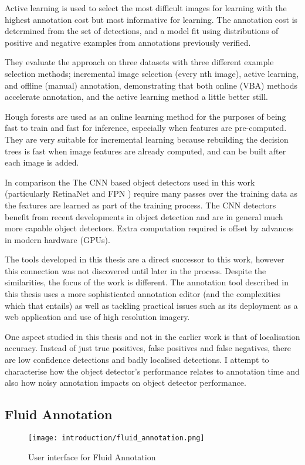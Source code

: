Active learning is used to select the most difficult images for learning with the highest annotation cost but most informative for learning. The annotation cost is determined from the set of detections, and a model fit using distributions of positive and negative examples from annotations previously verified. 

They evaluate the approach on  three datasets with three different example selection methods; incremental image selection (every nth image), active learning, and offline (manual) annotation, demonstrating that both online (\gls{VBA}) methods accelerate annotation, and the active learning method a little better still.

Hough forests \cite{Gall2011} are used as an online learning method for the purposes of being fast to train and fast for inference, especially when features are pre-computed. They are very suitable for incremental learning because rebuilding the decision trees is fast when image features are already computed, and can be built after each image is added. 

In comparison the The \gls{CNN} based object detectors used in this work (particularly RetinaNet \cite{Lin2017} and \gls{FPN} \cite{Lin2017a}) require many passes over the training data as the features are learned as part of the training process. The \gls{CNN} detectors benefit from recent developments in object detection and are in general much more capable object detectors. Extra computation required is offset by advances in modern hardware (\gls{GPU}s).

The tools developed in this thesis are a direct successor to this work, however this connection was not discovered until later in the process. 
Despite the similarities, the focus of the work is different. The annotation tool described in this thesis uses a more sophisticated annotation editor (and the complexities which that entails) as well as tackling practical issues such as its deployment as a web application and use of high resolution imagery.

One aspect studied in this thesis and not in the earlier work is that of localisation accuracy. Instead of just true positives, false positives and false negatives, there are low confidence detections and badly localised detections. I attempt to characterise how the object detector's performance relates to annotation time and also how noisy annotation impacts on object detector performance.


\subsection{Fluid Annotation \cite{Andriluka2018}}
\begin{figure}[h]
  \centering
  \texttt{[image: introduction/fluid\_annotation.png]}
  \caption{User interface for Fluid Annotation \cite{Andriluka2018}}  
  \label{fig:fluid_annotation}
\end{figure}

